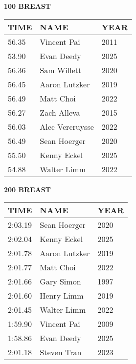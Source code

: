 \begin{minipage}[t]{0.48\textwidth}
\centering
\textbf{100 BREAST}\\[0.05cm]
\begin{tabular}{@{}p{1.8cm}p{2.8cm}p{1.2cm}@{}}
\hline
\textbf{TIME} & \textbf{NAME} & \textbf{YEAR} \\
\hline
56.35 & Vincent Pai & 2011 \\
53.90 & Evan Deedy & 2025 \\
56.36 & Sam Willett & 2020 \\
56.45 & Aaron Lutzker & 2019 \\
56.49 & Matt Choi & 2022 \\
56.27 & Zach Alleva & 2015 \\
56.03 & Alec Vercruysse & 2022 \\
56.49 & Sean Hoerger & 2020 \\
55.50 & Kenny Eckel & 2025 \\
54.88 & Walter Limm & 2022 \\
\hline
\end{tabular}
\end{minipage}\hfill
\begin{minipage}[t]{0.48\textwidth}
\centering
\textbf{200 BREAST}\\[0.05cm]
\begin{tabular}{@{}p{1.8cm}p{2.8cm}p{1.2cm}@{}}
\hline
\textbf{TIME} & \textbf{NAME} & \textbf{YEAR} \\
\hline
2:03.19 & Sean Hoerger & 2020 \\
2:02.04 & Kenny Eckel & 2025 \\
2:01.78 & Aaron Lutzker & 2019 \\
2:01.77 & Matt Choi & 2022 \\
2:01.66 & Gary Simon & 1997 \\
2:01.60 & Henry Limm & 2019 \\
2:01.45 & Walter Limm & 2022 \\
1:59.90 & Vincent Pai & 2009 \\
1:58.86 & Evan Deedy & 2025 \\
2:01.18 & Steven Tran & 2023 \\
\hline
\end{tabular}
\end{minipage}

\vspace{0.4cm}

